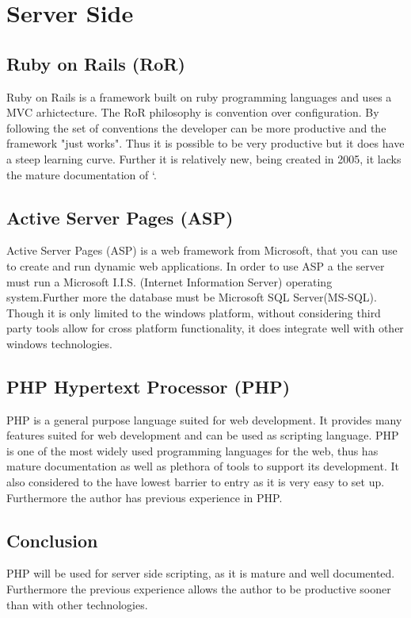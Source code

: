 \documentclass[a4paper,oneside,11pt]{report}
\begin{document}
\section{Server Side} 
\subsection{Ruby on Rails (RoR)}  
Ruby on Rails is a framework built on ruby programming languages and uses a MVC arhictecture. The RoR philosophy is convention over configuration. By following the set of conventions the developer can be more productive and the framework "just works". Thus it is possible to be very productive but it does have a steep learning curve. Further it is relatively new, being created in 2005, it lacks the mature documentation of `.

\subsection{Active Server Pages (ASP)} 
 Active Server Pages (ASP) is a web framework from Microsoft, that you can use to create and run dynamic web applications\autocite{microsoftasp}. In order to use ASP a the server must run a Microsoft I.I.S. (Internet Information Server) operating system.Further more the database must be Microsoft SQL Server(MS-SQL). Though it is only limited to the windows platform, without considering third party tools allow for cross platform functionality, it does integrate well with other windows technologies.
 
\subsection{PHP Hypertext Processor (PHP) } 
PHP is a general purpose language suited for web development. It provides many features suited for web development and can be used as scripting language. PHP is one of the most widely used programming languages for the web, thus has mature documentation as well as plethora of tools to support its development. It also considered to the have lowest barrier to entry as it is very easy to set up. Furthermore the author has previous experience in PHP.

\subsection{Conclusion}
PHP will be used for server side scripting, as it is mature and well documented. Furthermore the previous experience allows the author to be productive sooner than with other technologies.
\end{document}
